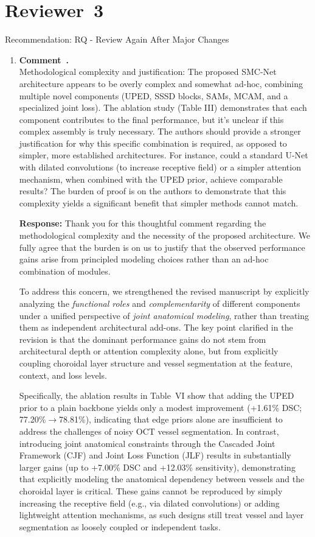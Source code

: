 \documentclass[11pt]{article}
\newcommand{\reviewersection}[1]{\section*{Reviewer~#1}}
\newcommand{\commentresponse}[2]{{\color{blue}\textbf{Response:} #2}}
\newcommand{\commentitem}{\item \textbf{Comment~\arabic{enumi}.}\\\ignorespaces}
\begin{document}
\reviewersection{3}
Recommendation: RQ - Review Again After Major Changes
\begin{enumerate}
    \commentitem Methodological complexity and justification: The proposed SMC-Net architecture appears to be overly complex and somewhat ad-hoc, combining multiple novel components (UPED, SSSD blocks, SAMs, MCAM, and a specialized joint loss). The ablation study (Table III) demonstrates that each component contributes to the final performance, but it's unclear if this complex assembly is truly necessary. The authors should provide a stronger justification for why this specific combination is required, as opposed to simpler, more established architectures. For instance, could a standard U-Net with dilated convolutions (to increase receptive field) or a simpler attention mechanism, when combined with the UPED prior, achieve comparable results? The burden of proof is on the authors to demonstrate that this complexity yields a significant benefit that simpler methods cannot match.

     \commentresponse{1}{
    Thank you for this thoughtful comment regarding the methodological complexity and the necessity of the proposed architecture.
    We fully agree that the burden is on us to justify that the observed performance gains arise from principled modeling choices rather than an ad-hoc combination of modules.
    
    To address this concern, we strengthened the revised manuscript by explicitly analyzing the \emph{functional roles} and \emph{complementarity} of different components under a unified perspective of \emph{joint anatomical modeling}, rather than treating them as independent architectural add-ons.
    The key point clarified in the revision is that the dominant performance gains do not stem from architectural depth or attention complexity alone, but from explicitly coupling choroidal layer structure and vessel segmentation at the feature, context, and loss levels.
    
    Specifically, the ablation results in Table~VI show that adding the UPED prior to a plain backbone yields only a modest improvement (+1.61\% DSC; 77.20\%$\rightarrow$78.81\%), indicating that edge priors alone are insufficient to address the challenges of noisy OCT vessel segmentation.
    In contrast, introducing joint anatomical constraints through the Cascaded Joint Framework (CJF) and Joint Loss Function (JLF) results in substantially larger gains (up to +7.00\% DSC and +12.03\% sensitivity), demonstrating that explicitly modeling the anatomical dependency between vessels and the choroidal layer is critical.
    These gains cannot be reproduced by simply increasing the receptive field (e.g., via dilated convolutions) or adding lightweight attention mechanisms, as such designs still treat vessel and layer segmentation as loosely coupled or independent tasks.
    
}
\end{enumerate}
\end{document}
